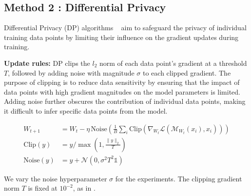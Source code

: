 \subsection{Method 2 : Differential Privacy}

Differential Privacy (DP) algorithms ~\cite{10.1145/2976749.2978318} aim to safeguard the privacy of individual training data points by limiting their influence on the gradient updates during training.

\noindent
\textbf{Update rules:}
DP clips the \textit{$l_2$} norm of each data point’s gradient at a threshold $T$, followed by adding noise with magnitude $\sigma$ to each clipped gradient.
The purpose of clipping is to reduce data sensitivity by ensuring that the impact of data points with high gradient magnitudes on the model parameters is limited.
Adding noise further obscures the contribution of individual data points, making it difficult to infer specific data points from the model.

\vspace{-10pt}
\small{
\begin{equation}
\begin{split}
    W_{t + 1} &= W_t - \eta \, \text{Noise} \left( \frac{1}{B} \sum_i \text{Clip}\left( \nabla_{W_t} \mathcal{L}(\mathcal{M}_{W_t}(x_i), x_i) \right) \right) \\
    \text{Clip}(y) &= y / \max \left( 1, \frac{\lVert y \rVert_2}{T} \right) \\
    \text{Noise}(y) &= y + \mathcal{N}(0, \sigma^2 T^2 \mathds{1})
\end{split}
\end{equation}
}
\normalsize
\vspace{-10pt}

We vary the noise hyperparameter $\sigma$ for the experiments.
The clipping gradient norm $T$ is fixed at $10^{-2}$, as in \cite{shi-etal-2022-selective}.

